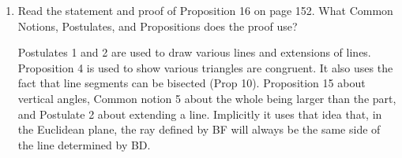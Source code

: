 \documentclass[12pt]{article}
\begin{document}
\begin{enumerate}
\item Read the statement and proof of Proposition 16 on page 152. What Common Notions, Postulates, and Propositions does the proof use?

Postulates 1 and 2 are used to draw various lines and extensions of lines. Proposition 4 is used to show various triangles are congruent. It also uses the fact that line segments can be bisected (Prop 10). Proposition 15 about vertical angles, Common notion 5 about the whole being larger than the part, and Postulate 2 about extending a line. Implicitly it uses that idea that, in the Euclidean plane, the ray defined by BF will always be the same side of the line determined by BD.

\end{enumerate}
\end{document}
